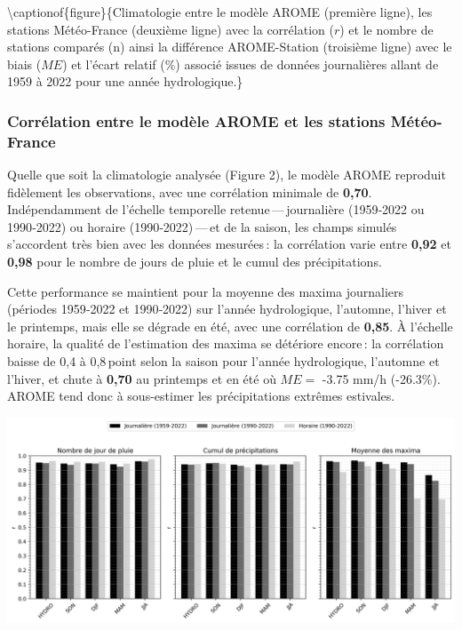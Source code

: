 \documentclass[
  article,
  nofooter,
  noheadings]{jss}
\begin{document}
\textbackslash captionof\{figure\}\{Climatologie entre le modèle AROME
(première ligne), les stations Météo-France (deuxième ligne) avec la
corrélation (\(r\)) et le nombre de stations comparés (n) ainsi la
différence AROME-Station (troisième ligne) avec le biais (\(ME\)) et
l'écart relatif (\%) associé issues de données journalières allant de
1959 à 2022 pour une année hydrologique.\}

\subsubsection{Corrélation entre le modèle AROME et les stations
Météo-France}\label{corruxe9lation-entre-le-moduxe8le-arome-et-les-stations-muxe9tuxe9o-france}

Quelle que soit la climatologie analysée (Figure 2), le modèle AROME
reproduit fidèlement les observations, avec une corrélation minimale de
\textbf{0,70}. Indépendamment de l'échelle temporelle
retenue\,---\,journalière (1959‑2022 ou 1990‑2022) ou horaire
(1990‑2022)\,---\,et de la saison, les champs simulés s'accordent très
bien avec les données mesurées\,: la corrélation varie entre
\textbf{0,92} et \textbf{0,98} pour le nombre de jours de pluie et le
cumul des précipitations.

Cette performance se maintient pour la moyenne des maxima journaliers
(périodes 1959‑2022 et 1990‑2022) sur l'année hydrologique, l'automne,
l'hiver et le printemps, mais elle se dégrade en été, avec une
corrélation de \textbf{0,85}. À l'échelle horaire, la qualité de
l'estimation des maxima se détériore encore\,: la corrélation baisse de
0,4 à 0,8\,point selon la saison pour l'année hydrologique, l'automne et
l'hiver, et chute à \textbf{0,70} au printemps et en été où \(ME =\)
-3.75 mm/h (-26.3\%). AROME tend donc à sous-estimer les précipitations
extrêmes estivales.

\includegraphics[width=1\linewidth,height=\textheight,keepaspectratio]{figures/histo_numday_mean_mean-max.png}
\end{document}
